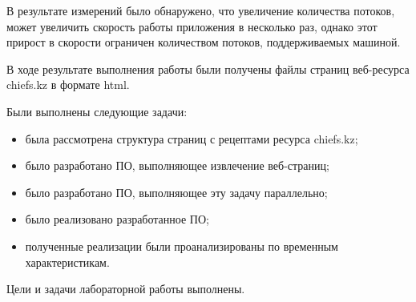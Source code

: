 
В результате измерений было обнаружено, что увеличение количества потоков, может увеличить скорость работы приложения в несколько раз, однако этот прирост в скорости ограничен количеством потоков, поддерживаемых машиной.

В ходе результате выполнения работы были получены файлы страниц веб-ресурса \\chiefs.kz в формате html.

Были выполнены следующие задачи:
\begin{itemize}
  \item была рассмотрена структура страниц с рецептами ресурса chiefs.kz;
  \item было разработано ПО, выполняющее извлечение веб-страниц;
  \item было разработано ПО, выполняющее эту задачу параллельно;
  \item было реализовано разработанное ПО;
  \item полученные реализации были проанализированы по временным характеристикам.
\end{itemize}

Цели и задачи лабораторной работы выполнены.
